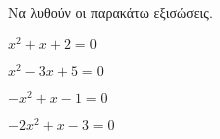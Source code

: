 Να λυθούν οι παρακάτω εξισώσεις.
\begin{multicols}{2}
\begin{alist}
\item $ x^2+x+2=0 $
\item $ x^2-3x+5=0 $
\item $ -x^2+x-1=0 $
\item $ -2x^2+x-3=0 $
\end{alist}
\end{multicols}

